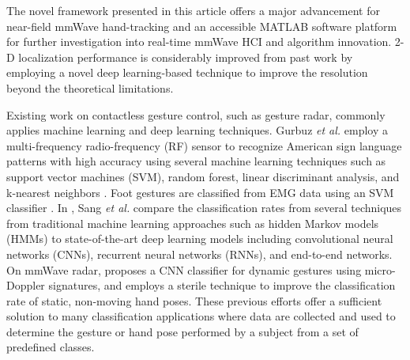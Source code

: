 \documentclass[10pt,journal,final]{IEEEtran}
\begin{document}
The novel framework presented in this article offers a major advancement for near-field mmWave hand-tracking and an accessible MATLAB software platform for further investigation into real-time mmWave HCI and algorithm innovation. 
2-D localization performance is considerably improved from past work \cite{mmWave_tracking:WiDeo} by employing a novel deep learning-based technique to improve the resolution beyond the theoretical limitations.

Existing work on contactless gesture control, such as gesture radar, commonly applies machine learning and deep learning techniques.
Gurbuz \textit{et al.} employ a multi-frequency radio-frequency (RF) sensor to recognize American sign language patterns with high accuracy using several machine learning techniques such as support vector machines (SVM), random forest, linear discriminant analysis, and k-nearest neighbors \cite{gurbuz2021american}.
Foot gestures are classified from EMG data using an SVM classifier \cite{maragliulo2019foot}. 
In \cite{sang2018micro}, Sang \textit{et al.} compare the classification rates from several techniques from traditional machine learning approaches such as hidden Markov models (HMMs) to state-of-the-art deep learning models including convolutional neural networks (CNNs), recurrent neural networks (RNNs), and end-to-end networks. 
On mmWave radar, \cite{kim2016hand} proposes a CNN classifier for dynamic gestures using micro-Doppler signatures, and \cite{josiah:hand_gesture_recognition} employs a sterile technique to improve the classification rate of static, non-moving hand poses.
These previous efforts offer a sufficient solution to many classification applications where data are collected and used to determine the gesture or hand pose performed by a subject from a set of predefined classes.
\end{document}
